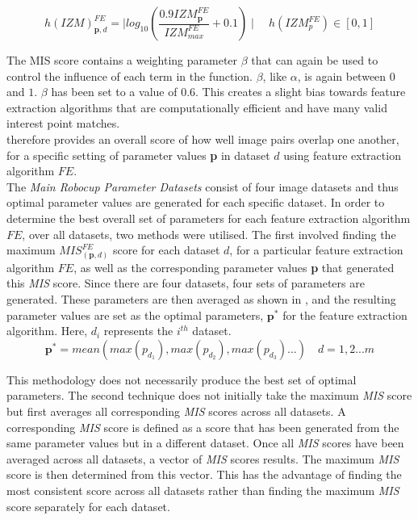 \begin{equation}
h(\textit{IZM})_{\textbf{p}, d}^{FE} = \mid log_{10}(\frac{0.9\textit{IZM}_{\textbf{p}}^{FE}}{\textit{IZM}_{max}^{FE}} + 0.1) \mid \quad h(\textit{IZM}_{p}^{FE})\in [0, 1]
\label{eqn:izm}
\end{equation}

The MIS score contains a weighting parameter $\beta$ that can again be used to control the influence of each term in the function. $\beta$, like $\alpha$, is again between $0$ and $1$. $\beta$ has been set to a value of $0.6$. This creates a slight bias towards feature extraction algorithms that are computationally efficient and have many valid interest point matches. \\

 therefore provides an overall score of how well image pairs overlap one another, for a specific setting of parameter values \textbf{p} in dataset $d$ using feature extraction algorithm $FE$. \\

The \textit{Main Robocup Parameter Datasets} consist of four image datasets and thus  optimal parameter values are generated for each specific dataset. In order to determine the best overall set of parameters for each feature extraction algorithm $FE$, over all datasets, two methods were utilised. The first involved finding the maximum $\textit{MIS}_{(\textbf{p}, d)}^{FE}$ score for each dataset $d$, for a particular feature extraction algorithm $FE$, as well as the corresponding parameter values \textbf{p} that generated this \textit{MIS} score. Since there are four datasets, four sets of parameters are generated. These parameters are then averaged as shown in , and the resulting parameter values are set as the optimal parameters, $\textbf{p}^*$ for the feature extraction algorithm. Here, $d_i$ represents the $i^{th}$ dataset.\\

\begin{equation}
\textbf{p}^* = mean( max(p_{d_1}), max(p_{d_2}), max(p_{d_3}) ...) \quad d = 1,2...m
\label{eqn:average}
\end{equation}

This methodology does not necessarily produce the best set of optimal parameters. The second technique does not initially take the maximum \textit{MIS} score but first averages all corresponding \textit{MIS} scores across all datasets. A corresponding \textit{MIS} score is defined as a score that has been generated from the same parameter values but in a different dataset. Once all \textit{MIS} scores have been averaged across all datasets, a vector of \textit{MIS} scores results. The maximum \textit{MIS} score is then determined from this vector. This has the advantage of finding the most consistent score across all datasets rather than finding the maximum \textit{MIS} score separately for each dataset.\\

